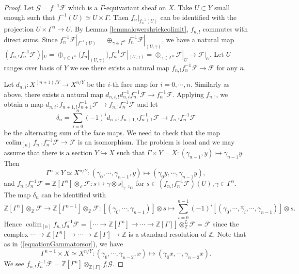 \documentclass{article}
\theoremstyle{definition}
\def\sF{{\mathscr{F}}}
\def\sG{{\mathscr{G}}}
\def\bbZ{\mathbb{Z}}
\DeclareMathOperator{\colim}{colim}
\begin{document}
\begin{proof}
	Let $\sG=f^{-1}\sF$ which is a $\Gamma$-equivariant sheaf on $X$. Take $U\subset Y$ small enough such that $f^{-1}(U)\simeq U\times \Gamma$. Then $f_n|_{f_n^{-1}(U)}$ can be identified with the projection $U\times \Gamma^n\rightarrow U$. By Lemma \ref{lemmalowershriekcolimit}, $f_{n,!}$ commutes with direct sums. Since $f_n^{-1}\sF|_{f^{-1}(U)}=\oplus_{\gamma\in \Gamma^{n}}f_n^{-1}\sF|_{(U,\gamma)}$, we have a natural map $(f_{n,!}f_n^{-1}\sF)|_{U}=\oplus_{\gamma\in \Gamma^{n}}(f_{n}|_{(U,\gamma)})_{!}f_{n}^{-1}\sF|_{(U,\gamma)}=\oplus_{\gamma\in \Gamma^{n}}\sF|_{U}\rightarrow \sF|_U$. Let $U$ ranges over basis of $Y$ we see there exists a natural map $f_{n,!}f_n^{-1}\sF\rightarrow \sF$ for any $n$.
	
	Let $d_{n,i}:X^{(n+1)/Y}\rightarrow X^{n/Y}$ be the $i$-th face map for $i=0,\cdots,n$. Similarly as above, there exists a natural map $ d_{n,i,!}d_{n,i}^{-1}f_{n}^{-1}\sF\rightarrow f_{n}^{-1}\sF$. Applying $f_{n,!}$, we obtain a map $d_{n,i}:f_{n+1,!}f_{n+1}^{-1}\sF\rightarrow f_{n,!}f_{n}^{-1}\sF$ and let
	\[ \delta_{n}=\sum_{i=0}^n(-1)^id_{n,i}: f_{n+1,!}f_{n+1}^{-1}\sF\rightarrow f_{n,!}f_{n}^{-1}\sF\]
    be the alternating sum of the face maps. We need to check that the map $\colim_{[n]}f_{n,!}f_{n}^{-1}\sF\rightarrow \sF$ is an isomorphism. The problem is local and we may assume that there is a section $Y\hookrightarrow X$ such that $\Gamma\times Y=X:(\gamma_{n-1},y)\mapsto \gamma_{n-1}y$. 
	Then
	\begin{equation}\label{equationGammatorsor}
		\Gamma^{n}\times Y\simeq X^{n/Y}:(\gamma_0,\cdots,\gamma_{n-1},y)\mapsto (\gamma_0y,\cdots,\gamma_{n-1}y),
   \end{equation}  
	and $f_{n,!}f_{n}^{-1}\sF=\bbZ[\Gamma^n]\otimes_{\bbZ}\sF: s\mapsto \gamma\otimes s|_{\gamma^{-1}U}$ for $s\in (f_{n,!}f_{n}^{-1}\sF)(U),\gamma\in\Gamma^n$.
	The map $\delta_n$ can be identified with 
	\[\bbZ[\Gamma^{n}]\otimes_{\bbZ}\sF\rightarrow \bbZ[\Gamma^{n-1}]\otimes_{\bbZ}\sF: [(\gamma_0,\cdots, \gamma_{n-1})]\otimes s\mapsto\sum_{i=0}^{n-1}(-1)^i [(\gamma_0,\cdots,\widehat{\gamma}_{i},\cdots,\gamma_{n-1})]\otimes s.\]
	Hence $\colim_{[n]}f_{n,!}f_{n}^{-1}\sF=[\cdots\rightarrow\bbZ[\Gamma^n]\rightarrow \cdots\rightarrow \bbZ[\Gamma]]\otimes^L_{\bbZ}\sF=\sF$ since the complex $\cdots\rightarrow\bbZ[\Gamma^n]\rightarrow \cdots\rightarrow \bbZ[\Gamma]\rightarrow \bbZ$
    is a standard resolution of $\bbZ$. Note that as in (\ref{equationGammatorsor}), we have
	\[\Gamma^{n-1}\times X\simeq X^{n/Y}:(\gamma_0,\cdots,\gamma_{n-2},x)\mapsto (\gamma_0x,\cdots,\gamma_{n-2}x).\]
	We see $f_{n,!}f_n^{-1}\sF=\bbZ[\Gamma^n]\otimes_{\bbZ[\Gamma]}f_!\sG$.
\end{proof} 
\end{document}
